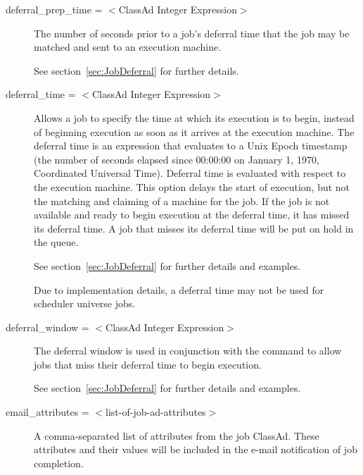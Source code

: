 \begin{description}
\label{condor-submit-deferral-prep-time}
\item[deferral\_prep\_time = $<$ClassAd Integer Expression$>$]
The number of seconds prior to a job's deferral time that
the job may be matched and sent to an execution machine.

See section~\ref{sec:JobDeferral} for further details.


\label{condor-submit-deferral-time}
\item[deferral\_time = $<$ClassAd Integer Expression$>$]
Allows a job to specify the time at which its execution
is to begin,
instead of beginning execution as soon as it arrives at the execution
machine. The deferral time is an expression that 
evaluates to a Unix Epoch timestamp (the number of
seconds elapsed since 00:00:00 on January 1, 1970, Coordinated
Universal Time). 
Deferral time is evaluated with respect to the execution machine.
This option delays the start of
execution, but not the matching and claiming of
a machine for the job.
If the job is not available and ready to begin
execution at the deferral time, it has missed its deferral time.
A job that misses its deferral time will be put on hold
in the queue. 

See section~\ref{sec:JobDeferral} for further details and examples.

Due to implementation details,
a deferral time may not be used for scheduler universe jobs.


\label{condor-submit-deferral-window}
\item[deferral\_window = $<$ClassAd Integer Expression$>$]
The deferral window is used in conjunction with the
 command to allow jobs that
miss their deferral time to begin execution.

See section~\ref{sec:JobDeferral} for further details and examples.


\label{condor-submit-email-attributes}
\item[email\_attributes = $<$list-of-job-ad-attributes$>$] 
A comma-separated list of attributes from the job ClassAd. These
attributes and their values will be included in the e-mail notification
of job completion.


\end{description}
